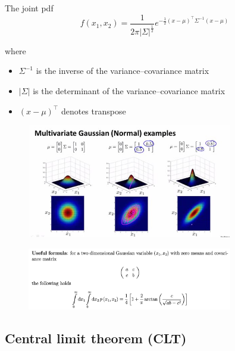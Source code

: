 \documentclass[11pt]{book} %
\begin{document}
The joint pdf
\[
f(x_1, x_2) = \frac{1}{2\pi |\Sigma|^{\frac{1}{2}}} e^{-\frac{1}{2}(x-\mu)^\top \Sigma^{-1} (x-\mu)}
\]

where
\begin{itemize}
    \item $\Sigma^{-1}$ is the inverse of the variance--covariance matrix
    \item $|\Sigma|$ is the determinant of the variance--covariance matrix
    \item $(x-\mu)^\top$ denotes transpose
\end{itemize}

\begin{figure}[h]
    \centering
    \includegraphics[width=0.8\textwidth]{Figs/multivariate_gaussians.jpeg}
    \label{fig:multivariate_gaussian}
\end{figure}



\begin{figure}[h]
    \centering
    \includegraphics[width=0.8\textwidth]{Figs/2_dim_gaussian.png}
    \label{fig:gaussian}
\end{figure}


\subsection{Central limit theorem (CLT)}
\end{document}
